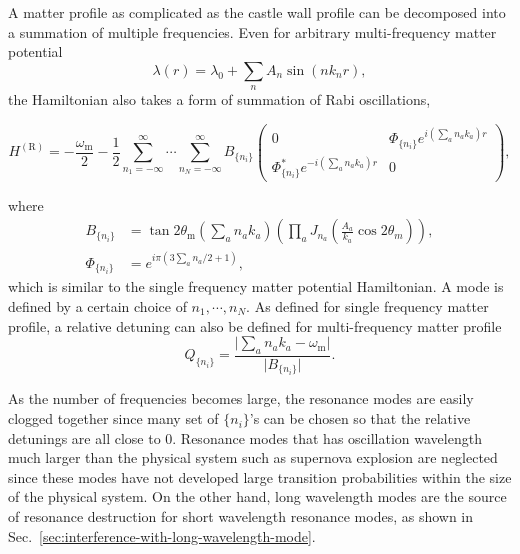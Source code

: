 \documentclass[%
reprint,
 amsmath,amssymb,
 aps,
]{revtex4-1}
\begin{document}
A matter profile as complicated as the castle wall profile can be decomposed into a summation of multiple frequencies. Even for arbitrary multi-frequency matter potential
\begin{equation}
    \lambda(r) = \lambda_0 + \sum_n A_n \sin (n k_n r),
\end{equation}
the Hamiltonian also takes a form of summation of Rabi oscillations,
\begin{widetext}
\begin{equation}
    H^{(\mathrm R)} = -\frac{\omega_{\mathrm m}}{2} - \frac{1}{2} \sum_{n_1=-\infty}^\infty \cdots \sum_{n_N = -\infty}^\infty B_{\{n_i\}} 
    \begin{pmatrix}
    0 & \Phi_{\{n_i\}} e^{i\left( \sum_a n_a k_a \right)r} \\
    \Phi_{\{n_i\}}^* e^{-i\left( \sum_a n_a k_a \right)r} & 0
    \end{pmatrix},
\end{equation}
\end{widetext}
where
\begin{align*}
    B_{\{n_i\}} &=  \tan 2\theta_{\mathrm m} \left( \sum_a n_a k_a \right) \left( \prod_a J_{n_a}\left( \frac{A_a}{k_a}\cos 2\theta_m \right) \right),\\
    \Phi_{\{n_i\}} &= e^{i\pi (3\sum_a n_a/2+1)},
\end{align*}
which is similar to the single frequency matter potential Hamiltonian. A mode is defined by a certain choice of $n_1,\cdots,n_N$. As defined for single frequency matter profile, a relative detuning can also be defined for multi-frequency matter profile
\begin{equation}
    Q_{\{n_i\}} = \frac{\lvert \sum_a n_a k_a - \omega_{\mathrm m} \rvert }{\lvert B_{\{n_i\}} \rvert}.
\end{equation}

As the number of frequencies becomes large, the resonance modes are easily clogged together since many set of $\{n_i\}$'s can be chosen so that the relative detunings are all close to 0. Resonance modes that has oscillation wavelength much larger than the physical system such as supernova explosion are neglected since these modes have not developed large transition probabilities within the size of the physical system. On the other hand, long wavelength modes are the source of resonance destruction for short wavelength resonance modes, as shown in Sec.~\ref{sec:interference-with-long-wavelength-mode}.
\end{document}
